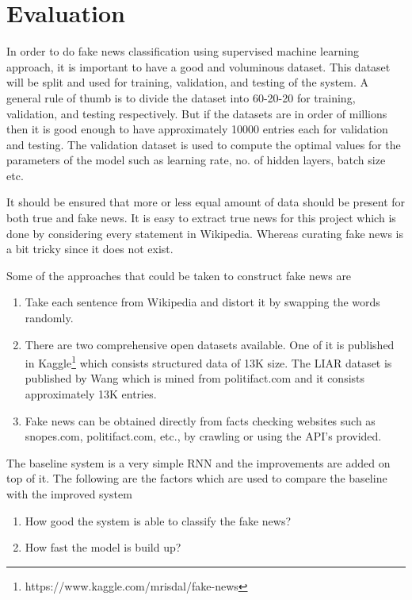 \documentclass[a4paper, 11pt]{article}
\begin{document}
\section{Evaluation}

In order to do fake news classification using supervised machine learning approach, it is important to have a good and voluminous dataset. This dataset will be split and used for training, validation, and testing of the system. A general rule of thumb is to divide the dataset into 60-20-20 for training, validation, and testing respectively. But if the datasets are in order of millions then it is good enough to have approximately 10000 entries each for validation and testing. The validation dataset is used to compute the optimal values for the parameters of the model such as learning rate, no. of hidden layers, batch size etc.

It should be ensured that more or less equal amount of data should be present for both true and fake news. It is easy to extract true news for this project which is done by considering every statement in Wikipedia. Whereas curating fake news is a bit tricky since it does not exist. 

Some of the approaches that could be taken to construct fake news are
\begin{enumerate}
\item Take each sentence from Wikipedia and distort it by swapping the words randomly.
\item There are two comprehensive open datasets available. One of it is published in Kaggle\footnote{https://www.kaggle.com/mrisdal/fake-news} which consists structured data of 13K size. The LIAR dataset is published by Wang \cite{Wang2017} which is mined from politifact.com and it consists approximately 13K entries.
\item Fake news can be obtained directly from facts checking websites such as snopes.com, politifact.com, etc., by crawling or using the API's provided.
\end{enumerate}

The baseline system is a very simple RNN and the improvements are added on top of it. The following are the factors which are used to compare the baseline with the improved system
\begin{enumerate}
\item How good the system is able to classify the fake news?
\item How fast the model is build up?
\end{enumerate}
\end{document}
